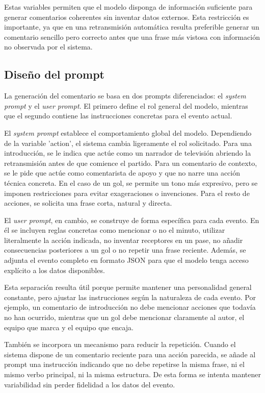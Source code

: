 Estas variables permiten que el modelo disponga de información suficiente para generar comentarios coherentes sin inventar datos externos. Esta restricción es importante, ya que en una retransmisión automática resulta preferible generar un comentario sencillo pero correcto antes que una frase más vistosa con información no observada por el sistema.

\subsection{Diseño del prompt}

La generación del comentario se basa en dos prompts diferenciados: el \textit{system prompt} y el \textit{user prompt}. El primero define el rol general del modelo, mientras que el segundo contiene las instrucciones concretas para el evento actual.

El \textit{system prompt} establece el comportamiento global del modelo. Dependiendo de la variable 'action', el sistema cambia ligeramente el rol solicitado. Para una introducción, se le indica que actúe como un narrador de televisión abriendo la retransmisión antes de que comience el partido. Para un comentario de contexto, se le pide que actúe como comentarista de apoyo y que no narre una acción técnica concreta. En el caso de un gol, se permite un tono más expresivo, pero se imponen restricciones para evitar exageraciones o invenciones. Para el resto de acciones, se solicita una frase corta, natural y directa.

El \textit{user prompt}, en cambio, se construye de forma específica para cada evento. En él se incluyen reglas concretas como mencionar o no el minuto, utilizar literalmente la acción indicada, no inventar receptores en un pase, no añadir consecuencias posteriores a un gol o no repetir una frase reciente. Además, se adjunta el evento completo en formato JSON para que el modelo tenga acceso explícito a los datos disponibles.

Esta separación resulta útil porque permite mantener una personalidad general constante, pero ajustar las instrucciones según la naturaleza de cada evento. Por ejemplo, un comentario de introducción no debe mencionar acciones que todavía no han ocurrido, mientras que un gol debe mencionar claramente al autor, el equipo que marca y el equipo que encaja.

También se incorpora un mecanismo para reducir la repetición. Cuando el sistema dispone de un comentario reciente para una acción parecida, se añade al prompt una instrucción indicando que no debe repetirse la misma frase, ni el mismo verbo principal, ni la misma estructura. De esta forma se intenta mantener variabilidad sin perder fidelidad a los datos del evento.

